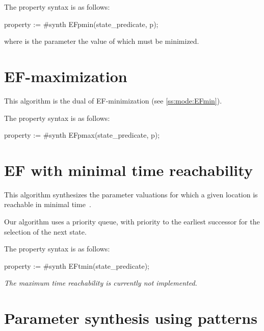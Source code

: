 The property syntax is as follows:

\begin{IMITATORproperty}
property := #synth EFpmin(state_predicate, p);
\end{IMITATORproperty}

where  is the parameter the value of which must be minimized.



\section{EF-maximization}\label{ss:mode:EFmax}

This algorithm is the dual of EF-minimization (see \cref{ss:mode:EFmin}).

The property syntax is as follows:

\begin{IMITATORproperty}
property := #synth EFpmax(state_predicate, p);
\end{IMITATORproperty}


\section{EF with minimal time reachability}\label{ss:mode:EFopt}

This algorithm synthesizes the parameter valuations for which a given location is reachable in minimal time~\cite{ABPV19}.

Our algorithm uses a priority queue, with priority to the earliest successor for the selection of the next state.


The property syntax is as follows:

\begin{IMITATORproperty}
property := #synth EFtmin(state_predicate);
\end{IMITATORproperty}

\emph{The maximum time reachability is currently not implemented.}


\section{Parameter synthesis using patterns}\label{ss:mode:prop}

